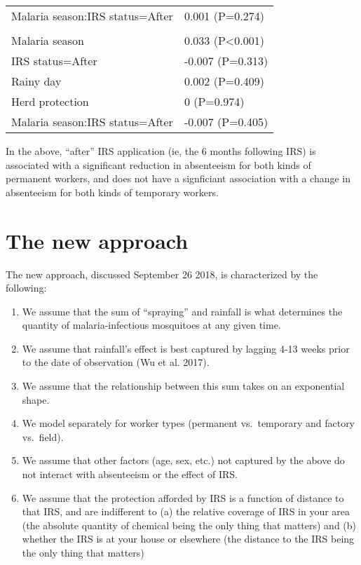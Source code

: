 \documentclass[]{article}
\providecommand{\tightlist}{%
  \setlength{\itemsep}{0pt}\setlength{\parskip}{0pt}}
\begin{document}
\begin{longtable}[t]{ll}
\hspace{1em}Malaria season:IRS status=After & 0.001 (P=0.274)\\
\addlinespace[1.5em]
\multicolumn{2}{l}{\textbf{Temporary not field worker}}\\
\hspace{1em}Malaria season & 0.033 (P<0.001)\\
\hspace{1em}IRS status=After & -0.007 (P=0.313)\\
\hspace{1em}Rainy day & 0.002 (P=0.409)\\
\hspace{1em}Herd protection & 0 (P=0.974)\\
\hspace{1em}Malaria season:IRS status=After & -0.007 (P=0.405)\\*
\end{longtable}

In the above, ``after'' IRS application (ie, the 6 months following IRS)
is associated with a significant reduction in absenteeism for both kinds
of permanent workers, and does not have a signficiant association with a
change in absenteeism for both kinds of temporary workers.

\section{The new approach}\label{the-new-approach}

The new approach, discussed September 26 2018, is characterized by the
following:

\begin{enumerate}
\def\labelenumi{\arabic{enumi}.}
\tightlist
\item
  We assume that the sum of ``spraying'' and rainfall is what determines
  the quantity of malaria-infectious mosquitoes at any given time.
\item
  We assume that rainfall's effect is best captured by lagging 4-13
  weeks prior to the date of observation (Wu et al. 2017).
\item
  We assume that the relationship between this sum takes on an
  exponential shape.
\item
  We model separately for worker types (permanent vs.~temporary and
  factory vs.~field).
\item
  We assume that other factors (age, sex, etc.) not captured by the
  above do not interact with absenteeism or the effect of IRS.
\item
  We assume that the protection afforded by IRS is a function of
  distance to that IRS, and are indifferent to (a) the relative coverage
  of IRS in your area (the absolute quantity of chemical being the only
  thing that matters) and (b) whether the IRS is at your house or
  elsewhere (the distance to the IRS being the only thing that matters)
\end{enumerate}
\end{document}
